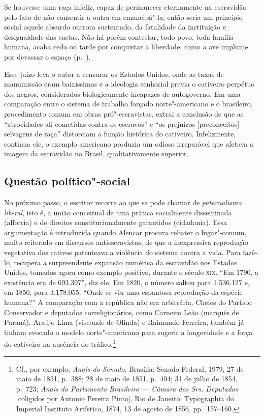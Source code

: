 \begin{hedraquote}
Se houvesse uma raça infeliz, capaz de permanecer eternamente na
escravidão pelo fato de não consentir a outra em emancipá"-la; então
seria um princípio social aquele absurdo outrora sustentado, da
fatalidade da instituição e desigualdade das castas. Não há porém
contestar, todo povo, toda família humana, acaba cedo ou tarde por
conquistar a liberdade, como a ave implume por devassar o espaço 
(p.~\pageref{implume}). 
\end{hedraquote}

Esse juízo leva o autor a censurar os Estados Unidos, onde as taxas de
manumissão eram baixíssimas e a ideologia senhorial previa o cativeiro
perpétuo dos negros, considerados biologicamente incapazes de
autogoverno. Em uma comparação entre o sistema de trabalho forçado
norte"-americano e o brasileiro, procedimento comum em obras
pró"-escravistas, extrai a conclusão de que as ``atrocidades ali
cometidas contra os escravos'' e ``os prejuízos [preconceitos] selvagens
de raça'' distorciam a função histórica do cativeiro. Infelizmente,
continua ele, o exemplo americano produzia um odioso irreparável que
afetava a imagem da escravidão no Brasil, qualitativamente superior.  

\subsection{Questão político"-social}

No próximo passo, o escritor recorre
ao que se pode chamar de \textit{paternalismo liberal}, isto é, a união conceitual
de uma prática socialmente disseminada (alforria) e de direitos 
constitucionalmente garantidos (cidadania). Essa argumentação é 
introduzida quando Alencar procura rebater o lugar"-comum, muito reiterado 
em discursos antiescravistas, de que a inexpressiva reprodução vegetativa 
dos cativos patenteava a violência do sistema contra a vida. Para fazê-lo, 
recupera a surpreendente expansão numérica da escravidão nos Estados Unidos,
tomados agora como exemplo positivo, durante o século \textsc{xix}. “Em 1790, 
a existência era de 693.397”, diz ele. Em 1820, o número saltou para 1.536.127 
e, em 1850, para 3.178.055. “Onde se viu uma espantosa reprodução da espécie 
humana?” A comparação com a república não era arbitrária. Chefes do Partido 
Conservador e deputados correligionários, como Carneiro Leão (marquês de Paraná), 
Araújo Lima (visconde de Olinda) e Raimundo Ferreira, também já tinham 
evocado o modelo norte"-americano para sugerir a longevidade e a força do 
cativeiro na ausência do tráfico.\footnote{ Cf., por exemplo,
\textit{Anais do Senado}. Brasília: Senado Federal, 1979, 
27 de maio de 1851, p.~388; 28 de maio de 1851, p.~404; 31 de julho de 1854, 
p.~723; \textit{Anais do Parlamento Brasileiro --- Câmara dos Srs. Deputados} [coligidos por
Antonio Pereira Pinto]. Rio de Janeiro: Typographia do Imperial
Instituto Artístico, 1874, 13 de agosto de 1856, pp.~157--160.} 

